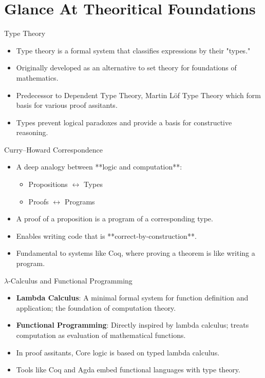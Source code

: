 \documentclass{beamer}
\begin{document}
\section{Glance At Theoritical Foundations}
\begin{frame}{Type Theory}
\begin{itemize}
  \item Type theory is a formal system that classifies expressions by their "types."
  \item Originally developed as an alternative to set theory for foundations of mathematics.
  \item Predecessor to Dependent Type Theory, Martin Löf Type Theory which form basis for various proof assitants.
  \item Types prevent logical paradoxes and provide a basis for constructive reasoning.
\end{itemize}
\end{frame}
\begin{frame}{Curry–Howard Correspondence}
\begin{itemize}
  \item A deep analogy between **logic and computation**:
  \begin{itemize}
    \item Propositions $\leftrightarrow$ Types
    \item Proofs $\leftrightarrow$ Programs
  \end{itemize}
  \item A proof of a proposition is a program of a corresponding type.
  \item Enables writing code that is **correct-by-construction**.
  \item Fundamental to systems like Coq, where proving a theorem is like writing a program.
\end{itemize}
\end{frame}
\begin{frame}{$\lambda$-Calculus and Functional Programming}
    \begin{itemize}
        \item \textbf{Lambda Calculus}: A minimal formal system for function definition and application; the foundation of computation theory.
  \item \textbf{Functional Programming}: Directly inspired by lambda calculus; treats computation as evaluation of mathematical functions.

  \item In proof assitants, Core logic is based on typed lambda calculus.
      \item Tools like Coq and Agda embed functional languages with type theory.
    \end{itemize}
\end{frame}
\end{document}
